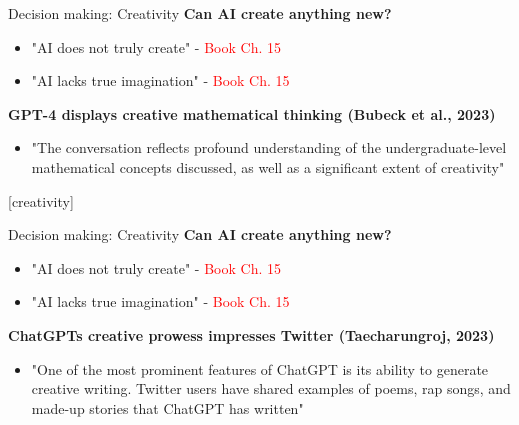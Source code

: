 \documentclass[8pt]{beamer}
\begin{document}
	\begin{frame}[t]{Decision making: Creativity}
		\textbf{Can AI create anything new?}
		\begin{itemize}
			\item "AI does not truly create" - \textcolor{red}{Book Ch. 15}
			\item "AI lacks true imagination" - \textcolor{red}{Book Ch. 15}
		\end{itemize}
		\textbf{GPT-4 displays creative mathematical thinking (Bubeck et al., 2023)}
		\begin{itemize}
			\item "The conversation reflects profound understanding of the undergraduate-level
			mathematical concepts discussed, as well as a significant extent of creativity"
		\end{itemize}
		\vspace{0.5cm}
		\centering
	\end{frame}

	[creativity]

	\begin{frame}[t]{Decision making: Creativity}
		\textbf{Can AI create anything new?}
		\begin{itemize}
			\item "AI does not truly create" - \textcolor{red}{Book Ch. 15}
			\item "AI lacks true imagination" - \textcolor{red}{Book Ch. 15}
		\end{itemize}
		\textbf{ChatGPTs creative prowess impresses Twitter (Taecharungroj, 2023)}
		\begin{itemize}
			\item "One of the most prominent features of ChatGPT is its ability
			to generate creative writing. Twitter users have shared examples
			of poems, rap songs, and made-up stories that ChatGPT has written"
		\end{itemize}
		\vspace{0.3cm}
		\centering
	\end{frame}
\end{document}

